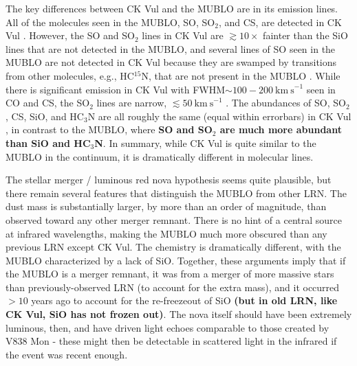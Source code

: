 \documentclass[]{aastex631}
\newcommand{\kms}{\ensuremath{\mathrm{km~s}^{-1}}\xspace}
\def\rr#1{\textbf{#1}}
\begin{document}
The key differences between CK Vul and the MUBLO are in its emission lines.
All of the molecules seen in the MUBLO, SO, SO$_2$, and CS, are detected in CK Vul \citep{Kaminski2020_CKI}.
However, the SO and SO$_2$ lines in CK Vul are $\gtrsim10\times$ fainter than the SiO lines that are not detected in the MUBLO, and several lines of SO seen in the MUBLO are not detected in CK Vul because they are swamped by transitions from other molecules, e.g., HC$^{15}$N, that are not present in the MUBLO \citep{Kaminski2017}.
While there is significant emission in CK Vul with FWHM$\sim100-200~\kms$ seen in CO and CS, the SO$_2$ lines are narrow, $\lesssim50~\kms$ \citep[][SO is detected but its line profile is not shown]{Kaminski2020_CKI}.
The abundances of SO, SO$_2$, CS, SiO, and HC$_3$N are all roughly the same (equal within errorbars) in CK Vul \citep{Kaminski2020_CKI}, in contrast to the MUBLO, where \rr{SO and SO$_2$ are much more abundant than SiO and HC$_3$N}.
In summary, while CK Vul is quite similar to the MUBLO in the continuum, it is dramatically different in molecular lines.




\vspace{0.5em}

The stellar merger / luminous red nova hypothesis seems quite plausible, but there remain several features that distinguish the MUBLO from other LRN.
The dust mass is substantially larger, by more than an order of magnitude, than observed toward any other merger remnant.
There is no hint of a central source at infrared wavelengths, making the MUBLO much more obscured than any previous LRN except CK Vul.
The chemistry is dramatically different, with the MUBLO characterized by a lack of SiO.
Together, these arguments imply that if the MUBLO is a merger remnant, it was from a merger of more massive stars than previously-observed LRN (to account for the extra mass), and it occurred $>10$ years ago to account for the re-freezeout of SiO \rr{(but in old LRN, like CK Vul, SiO has not frozen out)}.
The nova itself should have been extremely luminous, then, and have driven light echoes comparable to those created by V838 Mon - these might then be detectable in scattered light in the infrared if the event was recent enough.
\end{document}
